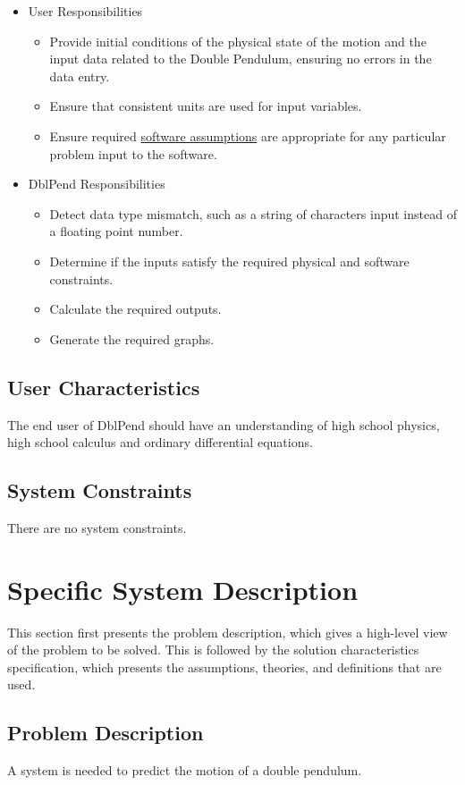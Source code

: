 \documentclass[12pt]{article}
\begin{document}
\begin{itemize}
\item{User Responsibilities}
\begin{itemize}
\item{Provide initial conditions of the physical state of the motion and the input data related to the Double Pendulum, ensuring no errors in the data entry.}
\item{Ensure that consistent units are used for input variables.}
\item{Ensure required \hyperref[Sec:Assumps]{software assumptions} are appropriate for any particular problem input to the software.}
\end{itemize}
\item{DblPend Responsibilities}
\begin{itemize}
\item{Detect data type mismatch, such as a string of characters input instead of a floating point number.}
\item{Determine if the inputs satisfy the required physical and software constraints.}
\item{Calculate the required outputs.}
\item{Generate the required graphs.}
\end{itemize}
\end{itemize}
\subsection{User Characteristics}
\label{Sec:UserChars}
The end user of DblPend should have an understanding of high school physics, high school calculus and ordinary differential equations.

\subsection{System Constraints}
\label{Sec:SysConstraints}
There are no system constraints.

\section{Specific System Description}
\label{Sec:SpecSystDesc}
This section first presents the problem description, which gives a high-level view of the problem to be solved. This is followed by the solution characteristics specification, which presents the assumptions, theories, and definitions that are used.

\subsection{Problem Description}
\label{Sec:ProbDesc}
A system is needed to predict the motion of a double pendulum.
\end{document}
